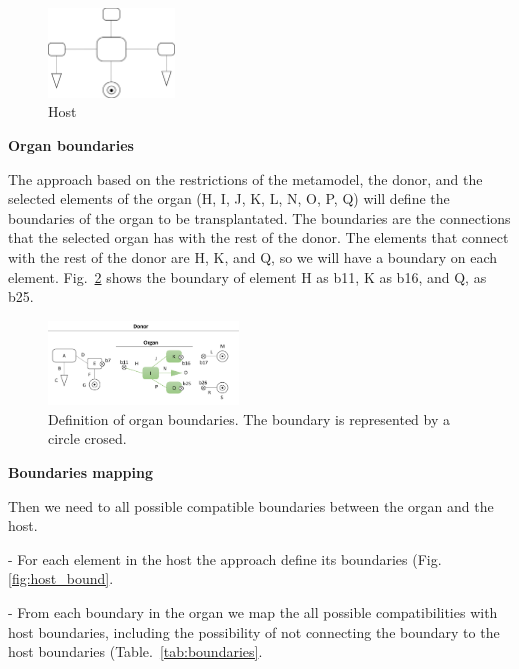 \begin{figure}[h]
    \centering
    \includegraphics[width=0.3\textwidth]{Figures/host.png}
    \caption{Host}
    \label{fig:host}
\end{figure}

\textbf{Organ boundaries}

The approach based on the restrictions of the metamodel, the donor, and the selected elements of the organ (H, I, J, K, L, N, O, P, Q) will define the boundaries of the organ to be transplantated. The boundaries are the connections that the selected organ has with the rest of the donor. The elements that connect with the rest of the donor are H, K, and Q, so we will have a boundary on each element. Fig.~\ref{fig:org_bound} shows the boundary of element H as b11, K as b16, and Q, as b25.

\begin{figure}[h]
    \centering
    \includegraphics[width=0.45\textwidth]{Figures/donor+organ_boundaries.png}
    \caption{Definition of organ boundaries. The boundary is represented by a circle crosed.}
    \label{fig:org_bound}
\end{figure}

\textbf{Boundaries mapping}

Then we need to all possible compatible boundaries between the organ and the host.

- For each element in the host the approach define its boundaries (Fig.\ref{fig:host_bound}.

- From each boundary in the organ we map the all possible compatibilities with host boundaries, including the possibility of not connecting the boundary to the host boundaries (Table.~\ref{tab:boundaries}.

